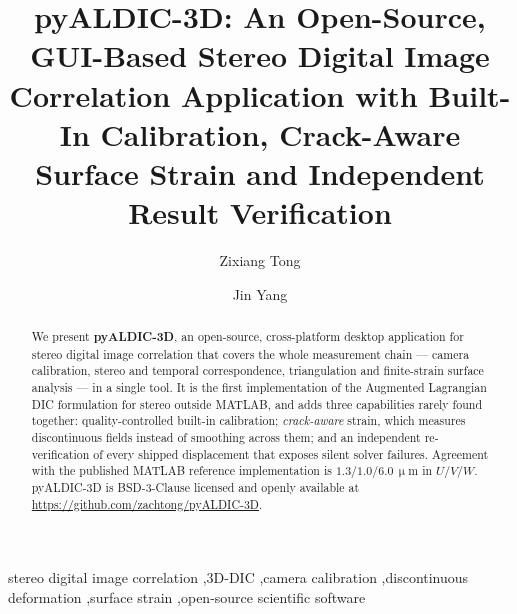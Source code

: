 \renewcommand{\labelenumii}{\arabic{enumi}.\arabic{enumii}}

\begin{frontmatter}

\title{pyALDIC-3D: An Open-Source, GUI-Based Stereo Digital Image Correlation Application with Built-In Calibration, Crack-Aware Surface Strain and Independent Result Verification}

\author[utae]{Zixiang Tong}

\author[utae,tmi]{Jin Yang}


\address[utae]{Department of Aerospace Engineering and Engineering Mechanics, The University of Texas at Austin, Austin, TX 78712, USA}
\address[tmi]{Texas Materials Institute, The University of Texas at Austin, Austin, TX 78712, USA}

\begin{abstract}
We present \textbf{pyALDIC-3D}, an open-source, cross-platform desktop application for stereo digital image correlation that covers the whole measurement chain --- camera calibration, stereo and temporal correspondence, triangulation and finite-strain surface analysis --- in a single tool. It is the first implementation of the Augmented Lagrangian DIC formulation for stereo outside MATLAB, and adds three capabilities rarely found together: quality-controlled built-in calibration; \emph{crack-aware} strain, which measures discontinuous fields instead of smoothing across them; and an independent re-verification of every shipped displacement that exposes silent solver failures. Agreement with the published MATLAB reference implementation is $1.3$/$1.0$/$6.0\,\upmu$m in $U$/$V$/$W$. pyALDIC-3D is BSD-3-Clause licensed and openly available at \url{https://github.com/zachtong/pyALDIC-3D}.
\end{abstract}

\begin{keyword}
stereo digital image correlation \sep 3D-DIC \sep camera calibration \sep discontinuous deformation \sep surface strain \sep open-source scientific software
\end{keyword}

\end{frontmatter}

